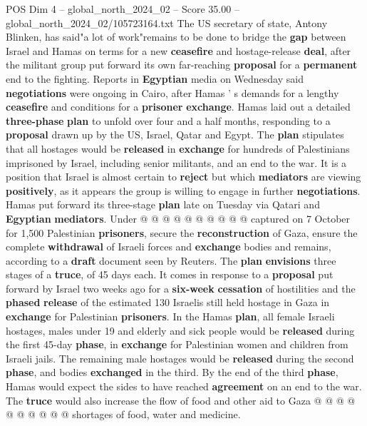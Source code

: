 \begin{textsample}{POS Dim 4 – global\_north\_2024\_02 – Score 35.00 – global\_north\_2024\_02/105723164.txt}  \label{ex:f4_pos_171}
The US secretary of state, Antony Blinken, has said"a lot of work"remains to be done to bridge the \textbf{gap} between Israel and Hamas on terms for a new \textbf{ceasefire} and hostage-release \textbf{deal}, after the militant group put forward its own far-reaching \textbf{proposal} for a \textbf{permanent} end to the fighting.
Reports in \textbf{Egyptian} media on Wednesday said \textbf{negotiations} were ongoing in Cairo, after Hamas ' s demands for a lengthy \textbf{ceasefire} and conditions for a \textbf{prisoner} \textbf{exchange}.
Hamas laid out a detailed \textbf{three-phase} \textbf{plan} to unfold over four and a half months, responding to a \textbf{proposal} drawn up by the US, Israel, Qatar and Egypt.
The \textbf{plan} stipulates that all hostages would be \textbf{released} in \textbf{exchange} for hundreds of Palestinians imprisoned by Israel, including senior militants, and an end to the war.
It is a position that Israel is almost certain to \textbf{reject} but which \textbf{mediators} are viewing \textbf{positively}, as it appears the group is willing to engage in further \textbf{negotiations}.
Hamas put forward its three-stage \textbf{plan} late on Tuesday via Qatari and \textbf{Egyptian} \textbf{mediators}.
Under @ @ @ @ @ @ @ @ @ @ captured on 7 October for 1,500 Palestinian \textbf{prisoners}, secure the \textbf{reconstruction} of Gaza, ensure the complete \textbf{withdrawal} of Israeli forces and \textbf{exchange} bodies and remains, according to a \textbf{draft} document seen by Reuters.
The \textbf{plan} \textbf{envisions} three stages of a \textbf{truce}, of 45 days each.
It comes in response to a \textbf{proposal} put forward by Israel two weeks ago for a \textbf{six-week} \textbf{cessation} of hostilities and the \textbf{phased} \textbf{release} of the estimated 130 Israelis still held hostage in Gaza in \textbf{exchange} for Palestinian \textbf{prisoners}.
In the Hamas \textbf{plan}, all female Israeli hostages, males under 19 and elderly and sick people would be \textbf{released} during the first 45-day \textbf{phase}, in \textbf{exchange} for Palestinian women and children from Israeli jails.
The remaining male hostages would be \textbf{released} during the second \textbf{phase}, and bodies \textbf{exchanged} in the third.
By the end of the third \textbf{phase}, Hamas would expect the sides to have reached \textbf{agreement} on an end to the war.
The \textbf{truce} would also increase the flow of food and other aid to Gaza @ @ @ @ @ @ @ @ @ @ shortages of food, water and medicine.

\end{textsample}
